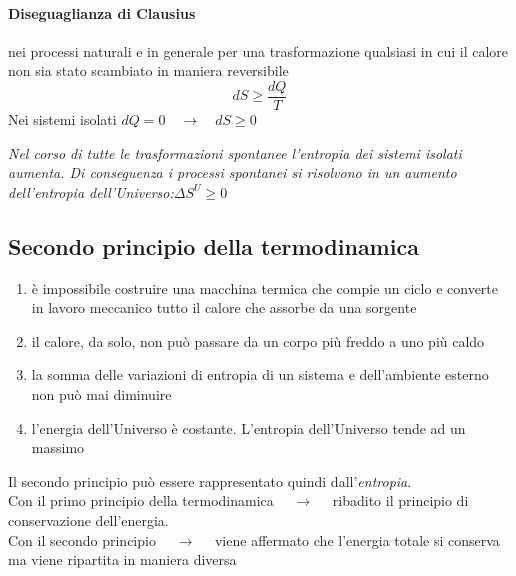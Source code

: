 \documentclass{article}
\newcommand{\so}{\quad \rightarrow \quad}
\begin{document}
\paragraph{Diseguaglianza di Clausius} nei processi naturali e in generale per una trasformazione qualsiasi in cui il calore non sia stato scambiato in maniera reversibile
\begin{equation*}
    dS\ge \frac{dQ}{T}
\end{equation*}
Nei sistemi isolati $dQ=0 \so dS\ge0$
\begin{center}
    \textit{Nel corso di tutte le trasformazioni spontanee l'entropia dei sistemi isolati aumenta. Di conseguenza i processi spontanei si risolvono in un aumento dell'entropia dell'Universo:}$\Delta S^U\ge0$
\end{center}

\subsection{Secondo principio della termodinamica}
\begin{enumerate}
    \item è impossibile costruire una macchina termica che compie un ciclo e converte in lavoro meccanico tutto il calore che assorbe da una sorgente
    \item il calore, da solo, non può passare da un corpo più freddo a uno più caldo
    \item la somma delle variazioni di entropia di un sistema e dell'ambiente esterno non può mai diminuire
    \item l'energia dell'Universo è costante. L'entropia dell'Universo tende ad un massimo
\end{enumerate}
Il secondo principio può essere rappresentato quindi dall'\textit{entropia}.\\
Con il primo principio della termodinamica $\so$ ribadito il principio di conservazione dell'energia. \\
Con il secondo principio $\so$ viene affermato che l'energia totale si conserva ma viene ripartita in maniera diversa
\end{document}
